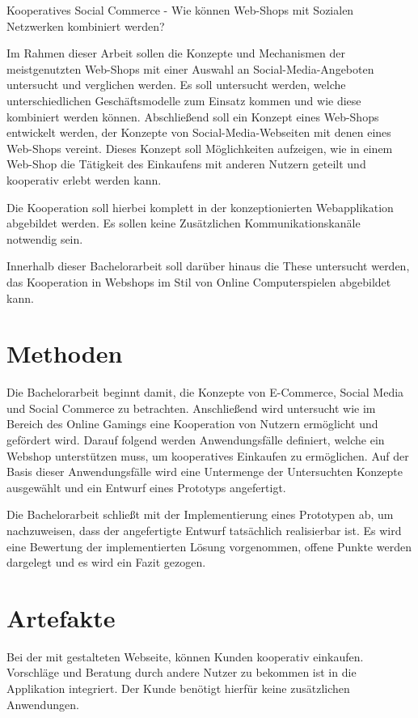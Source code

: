 Kooperatives Social Commerce
- Wie können Web-Shops mit Sozialen Netzwerken kombiniert werden?

Im Rahmen dieser Arbeit sollen die Konzepte und Mechanismen der meistgenutzten Web-Shops mit einer Auswahl an Social-Media-Angeboten untersucht und verglichen werden. Es soll untersucht werden, welche unterschiedlichen Geschäftsmodelle zum Einsatz kommen und wie diese kombiniert werden können. Abschließend soll ein Konzept eines Web-Shops entwickelt werden, der Konzepte von Social-Media-Webseiten mit denen eines Web-Shops vereint. Dieses Konzept soll Möglichkeiten aufzeigen, wie in einem Web-Shop die Tätigkeit des Einkaufens mit anderen Nutzern geteilt und kooperativ erlebt werden kann.

Die Kooperation soll hierbei komplett in der konzeptionierten Webapplikation abgebildet werden. Es sollen keine Zusätzlichen Kommunikationskanäle notwendig sein.

Innerhalb dieser Bachelorarbeit soll darüber hinaus die These untersucht werden, das Kooperation in Webshops im Stil von Online Computerspielen abgebildet kann.


\section{Methoden}

Die Bachelorarbeit beginnt damit, die Konzepte von E-Commerce, Social Media und Social Commerce zu betrachten. Anschließend wird untersucht wie im Bereich des Online Gamings eine Kooperation von Nutzern ermöglicht und gefördert wird. Darauf folgend werden Anwendungsfälle definiert, welche ein Webshop unterstützen muss, um kooperatives Einkaufen zu ermöglichen. Auf der Basis dieser Anwendungsfälle wird eine Untermenge der Untersuchten Konzepte ausgewählt und ein Entwurf eines Prototyps angefertigt.

Die Bachelorarbeit schließt mit der Implementierung eines Prototypen ab, um nachzuweisen, dass der angefertigte Entwurf tatsächlich realisierbar ist. Es wird eine Bewertung der implementierten Lösung vorgenommen, offene Punkte werden dargelegt und es wird ein Fazit gezogen.


\section{Artefakte}

Bei der mit  gestalteten Webseite, können Kunden kooperativ einkaufen. Vorschläge und Beratung durch andere Nutzer zu bekommen ist in die Applikation integriert. Der Kunde benötigt hierfür keine zusätzlichen Anwendungen.


